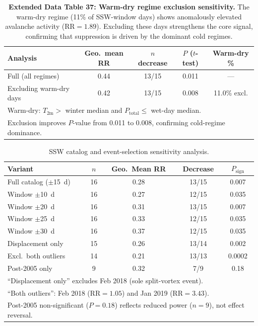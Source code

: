 \documentclass[11pt,letterpaper]{article}
\begin{document}
\begin{table}[h!]
\centering
\caption{\textbf{Extended Data Table 37: Warm-dry regime exclusion sensitivity.} The warm-dry regime (11\% of SSW-window days) shows anomalously elevated avalanche activity ($\mathrm{RR} = 1.89$). Excluding these days strengthens the core signal, confirming that suppression is driven by the dominant cold regimes.}
\label{tab:warm_dry_excl}
\begin{tabular}{lcccc}
\toprule
Analysis & Geo.\ mean RR & $n$ decrease & $P$ ($t$-test) & Warm-dry \% \\
\midrule
Full (all regimes) & 0.44 & 13/15 & 0.011 & --- \\
Excluding warm-dry days & 0.42 & 13/15 & 0.008 & 11.0\% excl. \\
\bottomrule
\multicolumn{5}{l}{\footnotesize Warm-dry: $T_{\mathrm{2m}} > $ winter median and $P_{\mathrm{total}} \leq$ wet-day median.} \\
\multicolumn{5}{l}{\footnotesize Exclusion improves $P$-value from 0.011 to 0.008, confirming cold-regime dominance.} \\
\end{tabular}
\end{table}

\begin{table}[htbp]
\centering
\caption{SSW catalog and event-selection sensitivity analysis.}
\label{tab:ssw_catalog}
\begin{tabular}{lcccc}
\hline
Variant & $n$ & Geo.\ Mean RR & Decrease & $P_{\mathrm{sign}}$ \\
\hline
Full catalog ($\pm$15~d) & 16 & 0.28 & 13/15 & 0.007 \\
Window $\pm$10~d & 16 & 0.27 & 12/15 & 0.035 \\
Window $\pm$20~d & 16 & 0.31 & 13/15 & 0.007 \\
Window $\pm$25~d & 16 & 0.33 & 12/15 & 0.035 \\
Window $\pm$30~d & 16 & 0.37 & 12/15 & 0.035 \\
Displacement only & 15 & 0.26 & 13/14 & 0.002 \\
Excl.\ both outliers & 14 & 0.21 & 13/13 & 0.0002 \\
Post-2005 only & 9 & 0.32 & 7/9 & 0.18 \\
\hline
\multicolumn{5}{l}{\footnotesize ``Displacement only'' excludes Feb 2018 (sole split-vortex event).} \\
\multicolumn{5}{l}{\footnotesize ``Both outliers'': Feb 2018 ($\mathrm{RR}=1.05$) and Jan 2019 ($\mathrm{RR}=3.43$).} \\
\multicolumn{5}{l}{\footnotesize Post-2005 non-significant ($P=0.18$) reflects reduced power ($n=9$), not effect reversal.} \\
\end{tabular}
\end{table}
\end{document}
